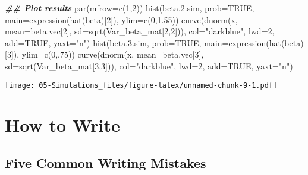 \documentclass[
]{book}
\newenvironment{Shaded}{\begin{snugshade}}{\end{snugshade}}
\newcommand{\AttributeTok}[1]{\textcolor[rgb]{0.77,0.63,0.00}{#1}}
\newcommand{\ConstantTok}[1]{\textcolor[rgb]{0.00,0.00,0.00}{#1}}
\newcommand{\DecValTok}[1]{\textcolor[rgb]{0.00,0.00,0.81}{#1}}
\newcommand{\DocumentationTok}[1]{\textcolor[rgb]{0.56,0.35,0.01}{\textbf{\textit{#1}}}}
\newcommand{\FloatTok}[1]{\textcolor[rgb]{0.00,0.00,0.81}{#1}}
\newcommand{\FunctionTok}[1]{\textcolor[rgb]{0.00,0.00,0.00}{#1}}
\newcommand{\NormalTok}[1]{#1}
\newcommand{\StringTok}[1]{\textcolor[rgb]{0.31,0.60,0.02}{#1}}
\begin{document}
\begin{Shaded}
\begin{Highlighting}[]
\DocumentationTok{\#\# Plot results}
\FunctionTok{par}\NormalTok{(}\AttributeTok{mfrow=}\FunctionTok{c}\NormalTok{(}\DecValTok{1}\NormalTok{,}\DecValTok{2}\NormalTok{))}
\FunctionTok{hist}\NormalTok{(beta.}\FloatTok{2.}\NormalTok{sim, }\AttributeTok{prob=}\ConstantTok{TRUE}\NormalTok{, }\AttributeTok{main=}\FunctionTok{expression}\NormalTok{(}\FunctionTok{hat}\NormalTok{(beta)[}\DecValTok{2}\NormalTok{]), }\AttributeTok{ylim=}\FunctionTok{c}\NormalTok{(}\DecValTok{0}\NormalTok{,}\FloatTok{1.55}\NormalTok{))}
\FunctionTok{curve}\NormalTok{(}\FunctionTok{dnorm}\NormalTok{(x, }\AttributeTok{mean=}\NormalTok{beta.vec[}\DecValTok{2}\NormalTok{], }\AttributeTok{sd=}\FunctionTok{sqrt}\NormalTok{(Var\_beta\_mat[}\DecValTok{2}\NormalTok{,}\DecValTok{2}\NormalTok{])), }
      \AttributeTok{col=}\StringTok{"darkblue"}\NormalTok{, }\AttributeTok{lwd=}\DecValTok{2}\NormalTok{, }\AttributeTok{add=}\ConstantTok{TRUE}\NormalTok{, }\AttributeTok{yaxt=}\StringTok{"n"}\NormalTok{)}
\FunctionTok{hist}\NormalTok{(beta.}\FloatTok{3.}\NormalTok{sim, }\AttributeTok{prob=}\ConstantTok{TRUE}\NormalTok{, }\AttributeTok{main=}\FunctionTok{expression}\NormalTok{(}\FunctionTok{hat}\NormalTok{(beta)[}\DecValTok{3}\NormalTok{]), }\AttributeTok{ylim=}\FunctionTok{c}\NormalTok{(}\DecValTok{0}\NormalTok{,.}\DecValTok{75}\NormalTok{))}
\FunctionTok{curve}\NormalTok{(}\FunctionTok{dnorm}\NormalTok{(x, }\AttributeTok{mean=}\NormalTok{beta.vec[}\DecValTok{3}\NormalTok{], }\AttributeTok{sd=}\FunctionTok{sqrt}\NormalTok{(Var\_beta\_mat[}\DecValTok{3}\NormalTok{,}\DecValTok{3}\NormalTok{])), }
      \AttributeTok{col=}\StringTok{"darkblue"}\NormalTok{, }\AttributeTok{lwd=}\DecValTok{2}\NormalTok{, }\AttributeTok{add=}\ConstantTok{TRUE}\NormalTok{, }\AttributeTok{yaxt=}\StringTok{"n"}\NormalTok{)}
\end{Highlighting}
\end{Shaded}

\texttt{[image: 05-Simulations\_files/figure-latex/unnamed-chunk-9-1.pdf]}

\hypertarget{how-to-write}{%
\chapter{How to Write}\label{how-to-write}}

\hypertarget{five-common-writing-mistakes}{%
\section{Five Common Writing Mistakes}\label{five-common-writing-mistakes}}
\end{document}
